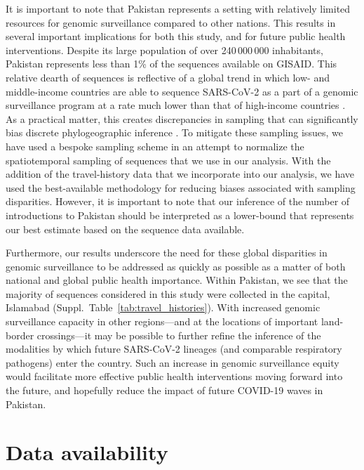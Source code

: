 It is important to note that Pakistan represents a setting with relatively limited resources for genomic surveillance compared to other nations.
This results in several important implications for both this study, and for future public health interventions.
Despite its large population of over 240\,000\,000 inhabitants, Pakistan represents less than 1\% of the sequences available on GISAID.
This relative dearth of sequences is reflective of a global trend in which low- and middle-income countries are able to sequence SARS-CoV-2 as a part of a genomic surveillance program at a rate much lower than that of high-income countries \cite{brito2022global}.
As a practical matter, this creates discrepancies in sampling that can significantly bias discrete phylogeographic inference \cite{layan2023impact}.
To mitigate these sampling issues, we have used a bespoke sampling scheme in an attempt to normalize the spatiotemporal sampling of sequences that we use in our analysis.
With the addition of the travel-history data that we incorporate into our analysis, we have used the best-available methodology for reducing biases associated with sampling disparities.
However, it is important to note that our inference of the number of introductions to Pakistan should be interpreted as a lower-bound that represents our best estimate based on the sequence data available.

Furthermore, our results underscore the need for these global disparities in genomic surveillance to be addressed as quickly as possible as a matter of both national and global public health importance.
Within Pakistan, we see that the majority of sequences considered in this study were collected in the capital, Islamabad (Suppl.~Table~\ref{tab:travel_histories}).
With increased genomic surveillance capacity in other regions---and at the locations of important land-border crossings---it may be possible to further refine the inference of the modalities by which future SARS-CoV-2 lineages (and comparable respiratory pathogens) enter the country.
Such an increase in genomic surveillance equity would facilitate more effective public health interventions moving forward into the future, and hopefully reduce the impact of future COVID-19 waves in Pakistan.

\section*{Data availability}

